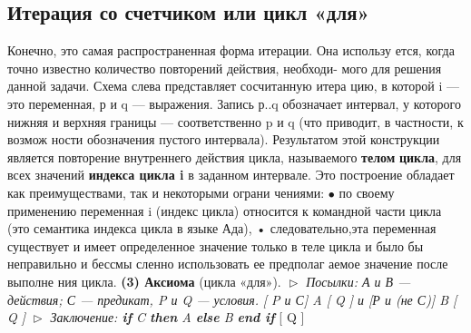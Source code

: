\documentclass{mai_book}
\begin{document}
\subsection{Итерация со счетчиком или цикл «для»}
Конечно,  это  самая  распространенная  форма  итерации.  Она использу­
ется, когда точно известно количество повторений действия, необходи-
\pagebreak
									мого для решения данной задачи. Схема 
									слева представляет сосчитанную итера­
									цию, в которой i — это переменная, р и 
									q — выражения. Запись р..q обозначает 
									интервал, у которого нижняя и  верхняя
границы — соответственно p и q (что приводит, в частности, к возмож­
ности обозначения пустого интервала). Результатом этой конструкции 
является повторение внутреннего действия цикла, называемого \textbf{телом}
\textbf{цикла}, для всех значений \textbf{индекса цикла i} в заданном интервале. Это 
построение обладает как преимуществами, так и некоторыми ограни­
чениями:
\newline
$\bullet$ по своему применению переменная i (индекс  цикла)  относится к 
командной  части  цикла  (это  семантика  индекса  цикла  в  языке 
Ада),
\newline
•  следовательно,эта переменная существует и имеет определенное 
значение только в теле цикла и было бы  неправильно и бессмы­
сленно использовать ее предполаг аемое значение после выполне­
ния цикла.
\textbf{(3) Аксиома} (цикла «для»).
\newline
$\vartriangleright$ \textit{Посылки: А и В --- действия; С --- предикат, P и Q --- условия.}
\textit{                            [ P и С] A [ Q ]  и [Р и (не С)] B [ Q ]}
\pagebreak
\newline
$\vartriangleright$ \textit{Заключение:  \textbf{if} \textit{C} \textbf{then} \textit{A} \textbf{else} \textit{B} \textbf{end if}} [ Q ]
\newline
\end{document}
